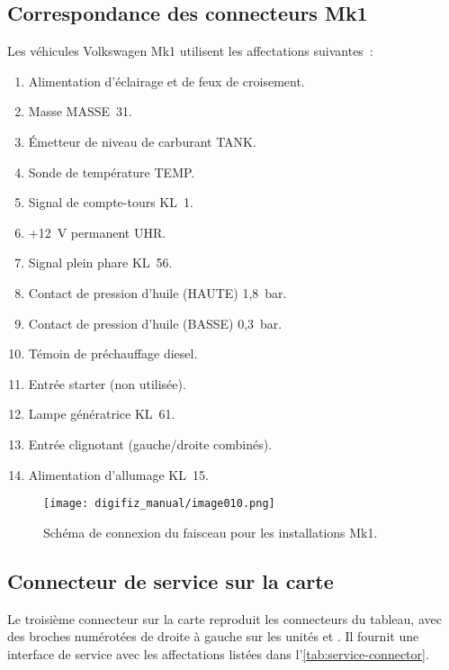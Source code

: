 \subsection{Correspondance des connecteurs Mk1}
Les véhicules Volkswagen Mk1 utilisent les affectations suivantes~:
\begin{enumerate}
    \item Alimentation d'éclairage et de feux de croisement.
    \item Masse MASSE~31.
    \item Émetteur de niveau de carburant TANK.
    \item Sonde de température TEMP.
    \item Signal de compte-tours KL~1.
    \item +12~V permanent UHR.
    \item Signal plein phare KL~56.
    \item Contact de pression d'huile (HAUTE) 1,8~bar.
    \item Contact de pression d'huile (BASSE) 0,3~bar.
    \item Témoin de préchauffage diesel.
    \item Entrée starter (non utilisée).
    \item Lampe génératrice KL~61.
    \item Entrée clignotant (gauche/droite combinés).
    \item Alimentation d'allumage KL~15.
\end{enumerate}
\begin{figure}[htbp]
    \centering
    \texttt{[image: digifiz\_manual/image010.png]}
    \caption{Schéma de connexion du faisceau pour les installations Mk1.}
\end{figure}

\subsection{Connecteur de service sur la carte}
Le troisième connecteur sur la carte reproduit les connecteurs du tableau, avec des broches numérotées de droite à gauche sur les unités \ReplicaGenOneShort{} et \ReplicaNextShort{}.
Il fournit une interface de service avec les affectations listées dans l'\autoref{tab:service-connector}.

